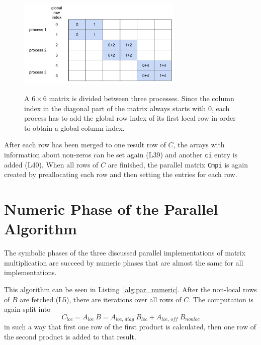\begin{figure}[tbp]
\centering
{\includegraphics[width=0.7\textwidth]{mm_diag_row}}
\caption{A $6 \times 6$ matrix is divided between three processes. Since the column index in the diagonal part of the matrix always starts with 0, each process has to add the global row index of its first local row in order to obtain a global column index.}
\label{fig:diag_row}
\end{figure}

After each row has been merged to one result row of $C$, the arrays with information about non-zeros can be set again (L39) and  another \texttt{ci} entry is added (L40). When all rows of $C$ are finished, the parallel matrix \texttt{Cmpi} is again created by preallocating each row and then setting the entries for each row.
\vspace{5mm}

\belowcaptionskip=-10pt



\section{Numeric Phase of the Parallel Algorithm}

The symbolic phases of the three discussed parallel implementations of matrix multiplication are succeed by numeric phases that are almost the same for all implementations. 

This algorithm can be seen in Listing~\ref{alg:par_numeric}. After the non-local rows of $B$ are fetched (L5), there are iterations over all rows of $C$. The computation is again split into
\begin{equation}
C_{\textit{loc}} = A_{\textit{loc~}} B = A_{\textit{loc, diag~}}B_{\textit{loc}} + A_{\textit{loc, off~}}B_{\textit{nonloc}}
\end{equation}
 in such a way that first one row of the first product is calculated, then one row of the second product is added to that result.

